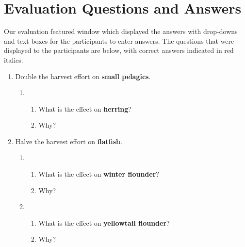 \section{Evaluation Questions and Answers}

Our evaluation featured window which displayed the answers with drop-downs and text boxes for the participants to enter answers.  The questions that were displayed to the participants are below, with correct answers indicated in red italics.

\begin{enumerate}
\item Double the harvest effort on \textbf{small pelagics}.

\begin{enumerate}
\item 
\begin{enumerate}
\item What is the effect on \textbf{herring}? 
\item Why? 
\end{enumerate}
\end{enumerate}

\item Halve the harvest effort on \textbf{flatfish}.

\begin{enumerate}
\item 
\begin{enumerate}
\item What is the effect on \textbf{winter flounder}? 
\item Why? 
\end{enumerate}

\item 
\begin{enumerate}
\item What is the effect on \textbf{yellowtail flounder}? 
\item Why? 
\end{enumerate}
\end{enumerate}


\end{enumerate}
